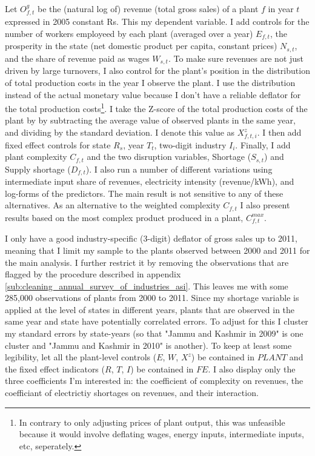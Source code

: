 \documentclass[11pt]{article}
\begin{document}
Let $O^{g}_{f,t}$ be the (natural log of) revenue (total gross sales) of a plant $f$ in year $t$ expressed in 2005 constant Rs. This my dependent variable. I add controls for the number of workers employeed by each plant (averaged over a year) $E_{f,t}$, the prosperity in the state (net domestic product per capita, constant prices) $N_{s,t}$, and the share of revenue paid as wages $W_{s,t}$. To make sure revenues are not just driven by large turnovers, I also control for the plant's position in the distribution of total production costs in the year I observe the plant. I use the distribution instead of the actual monetary value because I don't have a reliable deflator for the total production costs\footnote{In contrary to only adjusting prices of plant output, this was unfeasible because it would involve deflating wages, energy inputs, intermediate inputs, etc, seperately.}. I take the Z-score of the total production costs of the plant by by subtracting the average value of observed plants in the same year, and dividing by the standard deviation. I denote this value as $X^{z}_{f,t,i}$. I then add fixed effect controls for state $R_{s}$, year $T_{t}$, two-digit industry $I_i$. Finally, I add plant complexity $C_{f,t}$ and the two disruption variables, Shortage ($S_{s,t}$) and Supply shortage ($D_{f,t}$). I also run a number of different variations using intermediate input share of revenues, electricity intensity (revenue/kWh), and log-forms of the predictors. The main result is not sensitive to any of these alternatives. As an alternative to the weighted complexity $C_{f,t}$ I also present results based on the most complex product produced in a plant, $C^{max}_{f,t}$.

I only have a good industry-specific (3-digit) deflator of gross sales up to 2011, meaning that I limit my sample to the plants observed between 2000 and 2011 for the main analysis. I further restrict it by removing the observations that are flagged by the procedure described in appendix \ref{sub:cleaning_annual_survey_of_industries_asi}. This leaves me with some 285,000 observations of plants from 2000 to 2011. Since my shortage variable is applied at the level of states in different years, plants that are observed in the same year and state have potentially correlated errors. To adjust for this I cluster my standard errors by state-years (so that "Jammu and Kashmir in 2009" is one cluster and "Jammu and Kashmir in 2010" is another). 
To keep at least some legibility, let all the plant-level controls ($E$, $W$, $X^{z}$) be contained in $PLANT$ and the fixed effect indicators ($R$, $T$, $I$) be contained in $FE$. I also display only the three coefficients I'm interested in: the coefficient of complexity on revenues, the coefficiant of electrictiy shortages on revenues, and their interaction. 
\end{document}
